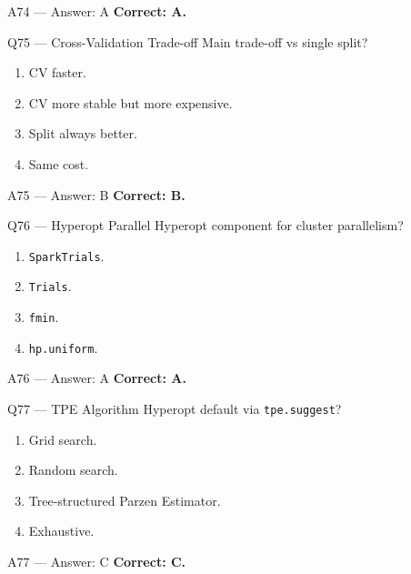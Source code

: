 \documentclass[aspectratio=169,9pt]{beamer}
\begin{document}
	\begin{frame}{A74 — Answer: A}
		\textbf{Correct: A.}
	\end{frame}
	
	\begin{frame}{Q75 — Cross-Validation Trade-off}
		Main trade-off vs single split?
		\begin{enumerate}[label=\Alph*.]
			\item CV faster.
			\item CV more stable but more expensive.
			\item Split always better.
			\item Same cost.
		\end{enumerate}
	\end{frame}
	
	\begin{frame}{A75 — Answer: B}
		\textbf{Correct: B.}
	\end{frame}
	
	\begin{frame}{Q76 — Hyperopt Parallel}
		Hyperopt component for cluster parallelism?
		\begin{enumerate}[label=\Alph*.]
			\item \texttt{SparkTrials}.
			\item \texttt{Trials}.
			\item \texttt{fmin}.
			\item \texttt{hp.uniform}.
		\end{enumerate}
	\end{frame}
	
	\begin{frame}{A76 — Answer: A}
		\textbf{Correct: A.}
	\end{frame}
	
	\begin{frame}{Q77 — TPE Algorithm}
		Hyperopt default via \texttt{tpe.suggest}?
		\begin{enumerate}[label=\Alph*.]
			\item Grid search.
			\item Random search.
			\item Tree-structured Parzen Estimator.
			\item Exhaustive.
		\end{enumerate}
	\end{frame}
	
	\begin{frame}{A77 — Answer: C}
		\textbf{Correct: C.}
	\end{frame}
	
\end{document}
